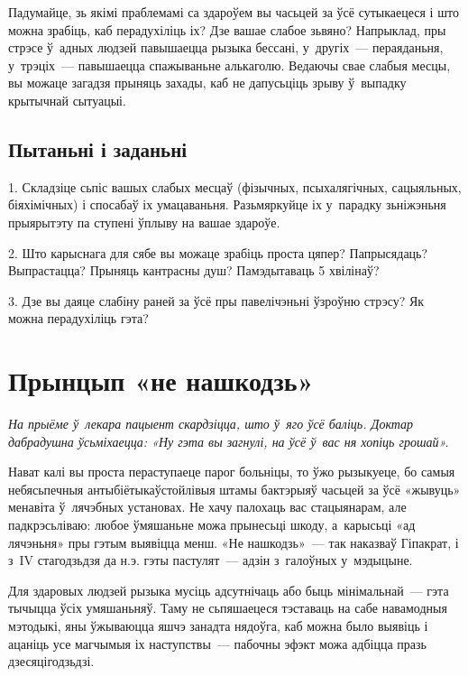 Падумайце, зь якімі праблемамі са здароўем вы часьцей за ўсё сутыкаецеся і што можна зрабіць, каб перадухіліць іх? Дзе вашае слабое зьвяно? Напрыклад, пры стрэсе ў~адных людзей павышаецца рызыка бессані, у~другіх~--- пераяданьня, у~трэціх~--- павышаецца спажываньне алькаголю. Ведаючы свае слабыя месцы, вы можаце загадзя прыняць захады, каб не дапусьціць зрыву ў~выпадку крытычнай сытуацыі.

\subsection*{Пытаньні і заданьні}

1. Складзіце сьпіс вашых слабых месцаў (фізычных, псыхалягічных, сацыяльных, біяхімічных) і спосабаў іх умацаваньня. Разьмяркуйце іх у~парадку зьніжэньня прыярытэту па ступені ўплыву на вашае здароўе.

2. Што карыснага для сябе вы можаце зрабіць проста цяпер? Папрысядаць? Выпрастацца? Прыняць кантрасны душ? Памэдытаваць 5 хвілінаў?

3. Дзе вы даяце слабіну раней за ўсё пры павелічэньні ўзроўню стрэсу? Як можна перадухіліць гэта?


\section{Прынцып «не нашкодзь»}

\emph{На прыёме ў~лекара пацыент скардзіцца, што ў~яго ўсё баліць. Доктар дабрадушна ўсьміхаецца: «Ну гэта вы загнулі, на ўсё ў~вас ня хопіць грошай».}

Нават калі вы проста пераступаеце парог больніцы, то ўжо рызыкуеце, бо самыя небясьпечныя антыбіётыкаўстойлівыя штамы бактэрыяў часьцей за ўсё «жывуць» менавіта ў~лячэбных установах. Не хачу палохаць вас стацыянарам, але падкрэсьліваю: любое ўмяшаньне можа прынесьці шкоду, а~карысьці «ад лячэньня» пры гэтым выявіцца менш. «Не нашкодзь»~--- так наказваў Гіпакрат, і з~IV стагодзьдзя да н.э. гэты пастулят~--- адзін з~галоўных у~мэдыцыне. 


Для здаровых людзей рызыка мусіць адсутнічаць або быць мінімальнай~--- гэта тычыцца ўсіх умяшаньняў. Таму не сьпяшаецеся тэставаць на сабе навамодныя мэтодыкі, яны ўжываюцца яшчэ занадта нядоўга, каб можна было выявіць і ацаніць усе магчымыя іх наступствы~--- пабочны эфэкт можа адбіцца празь дзесяцігодзьдзі.

